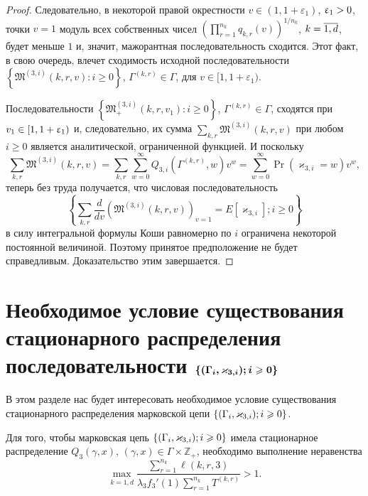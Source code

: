 \begin{proof}
Следовательно,  в некоторой правой окрестности $v \in (1,  1 + \varepsilon_1)$,  $\varepsilon_1 \hm> 0$,  точки $v=1$ модуль всех собственных чисел $\left(\prod_{r=1}^{n_k}q_{k, r} (v)\right)^{1/n_k}$,  $k\hm=\overline{1, d}$,  будет меньше $1$ и,  значит,  мажорантная последовательность сходится. Этот факт,  в свою очередь,  влечет сходимость исходной последовательности $\left\{\mathfrak{M}^{(3, i)}(k, r, v)\colon i \geqslant 0\right\}$,  $\Gamma^{(k, r)} \in \Gamma$,  для $v \in [1,  1 + \varepsilon_1)$.

Последовательности $\left\{\mathfrak{M}_+^{(3, i)}(k, r, v_1)\colon i \geqslant 0\right\}$,  $\Gamma^{(k, r)} \in \Gamma$,  сходятся при $v_1 \hm\in [1, 1+\varepsilon_1)$ и,  следовательно,  их сумма 
$\sum_{k, r} \mathfrak{M}^{(3, i)}(k, r, v)$ при любом $i\geqslant 0$ является аналитической,  ограниченной  функцией.
И поскольку
\begin{equation}
\sum_{k, r} \mathfrak{M}^{(3, i)}(k, r, v) = \sum_{k, r} \sum_{w=0}^{\infty} Q_{3, i}(\Gamma^{(k, r)}, w) v^w = 
 \sum_{w=0}^{\infty} \Pr(\varkappa_{3, i}=w) v^w, 
\end{equation}
теперь без труда получается,  что числовая последовательность 
$$
\left\{\sum_{k, r} \frac{d}{dv}\left(\mathfrak{M}^{(3, i)}(k, r, v)\right)_{v=1}= E[\varkappa_{3, i}]; i\geqslant 0\right\} 
$$
в силу интегральной формулы Коши равномерно по $i$ ограничена некоторой постоянной величиной. Поэтому принятое предположение не будет справедливым. Доказательство этим завершается.
\end{proof}








\section[Необходимое условие существования стационарного {распределения} последовательности ${\MarkThree}$]%
{Необходимое условие существования стационарного {распределения} последовательности $\boldsymbol{\MarkThree}$}
В этом разделе нас будет интересовать необходимое условие существования стационарного распределения марковской цепи $\MarkThree$.
\begin{theorem}
Для того,  чтобы марковская цепь $\MarkThree$ имела стационарное распределение $Q_3(\gamma, x)$,  $(\gamma, x)\in \Gamma \times {\mathbb Z}_+$,  необходимо выполнение неравенства
$$
\max_{k=\overline{1, d}} { \frac{\sum_{r = 1}^{n_{k}}\ell(k, r, 3)}{\lambda_3 f_3'(1) \sum_{r = 1}^{n_k} T^{(k, r)}} } >1.
$$
\end{theorem}

